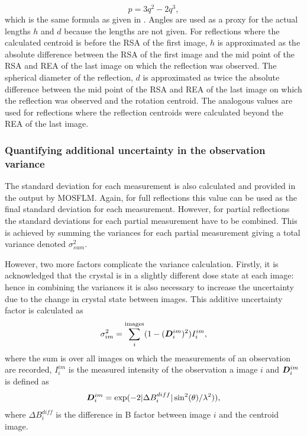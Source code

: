 \begin{equation}
    p = 3q^2 - 2q^3,
    \label{eq:eq:Spherical cap volume ratio - Rossman}
\end{equation}
which is the same formula as given in \cite{rossmann1979processing}.
Angles are used as a proxy for the actual lengths $h$ and $d$ because the lengths are not given.
For reflections where the calculated centroid is before the RSA of the first image, $h$ is approximated as the absolute difference between the RSA of the first image and the mid point of the RSA and REA of the last image on which the reflection was observed.
The spherical diameter of the reflection, $d$ is approximated as twice the absolute difference between the mid point of the RSA and REA of the last image on which the reflection was observed and the rotation centroid.
The analogous values are used for reflections where the reflection centroids were calculated beyond the REA of the last image.

\subsubsection{Quantifying additional uncertainty in the observation variance}
\label{subs:Quantifying additional uncertainty in the observation variance}
The standard deviation for each measurement is also calculated and provided in the output by MOSFLM.
Again, for full reflections this value can be used as the final standard deviation for each measurement.
However, for partial reflections the standard deviations for each partial measurement have to be combined.
This is achieved by summing the variances for each partial measurement giving a total variance denoted $\sigma^2_{sum}$.

However, two more factors complicate the variance calculation.
Firstly, it is acknowledged that the crystal is in a slightly different dose state at each image: hence in combining the variances it is also necessary to increase the uncertainty due to the change in crystal state between images.
This additive uncertainty factor is calculated as
\begin{equation}
    \sigma_{im}^2 = \sum_i^{\text{images}} (1 - (\boldsymbol{D}^{im}_i)^2) I^{im}_i,
\end{equation}
where the sum is over all images on which the measurements of an observation are recorded, $I^{im}_i$ is the measured intensity of the observation a image $i$ and $\boldsymbol{D}^{im}_i$ is defined as
\begin{equation}
    \boldsymbol{D}^{im}_i = \exp(-2 |\Delta B_{i}^{diff}|\sin^2(\theta) / \lambda^2)),
\end{equation}
where $\Delta B_{i}^{diff}$ is the difference in B factor between image $i$ and the centroid image.

